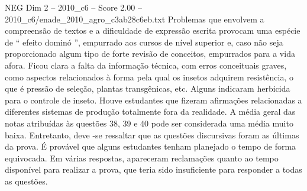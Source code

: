 \begin{textsample}{NEG Dim 2 – 2010\_c6 – Score 2.00 – 2010\_c6/enade\_2010\_agro\_c3ab28c6eb.txt}
Problemas que envolvem a compreensão de textos e a dificuldade de expressão escrita provocam uma espécie de “ efeito dominó ”, empurrado aos cursos de nível superior e, caso não seja proporcionado algum tipo de forte revisão de conceitos, empurrados para a vida afora.
Ficou clara a falta da informação técnica, com erros conceituais graves, como aspectos relacionados à forma pela qual os insetos adquirem resistência, o que é pressão de seleção, plantas transgênicas, etc.
Alguns indicaram herbicida para o controle de inseto.
Houve estudantes que fizeram afirmações relacionadas a diferentes sistemas de produção totalmente fora da realidade.
A média geral das notas atribuídas às questões 38, 39 e 40 pode ser considerada uma média muito baixa.
Entretanto, deve -se ressaltar que as questões discursivas foram as últimas da prova.
É provável que alguns estudantes tenham planejado o tempo de forma equivocada.
Em várias respostas, apareceram reclamações quanto ao tempo disponível para realizar a prova, que teria sido insuficiente para responder a todas as questões.

\end{textsample}
